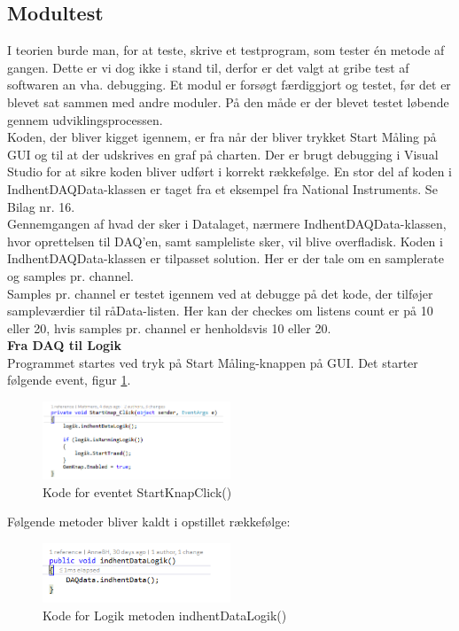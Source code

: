 \subsection{Modultest}
I teorien burde man, for at teste, skrive et testprogram, som tester én metode af gangen. Dette er vi dog ikke i stand til, derfor er det valgt at gribe test af softwaren an vha. debugging. Et modul er forsøgt færdiggjort og testet, før det er blevet sat sammen med andre moduler. På den måde er der blevet testet løbende gennem udviklingsprocessen. \\ \newline
Koden, der bliver kigget igennem, er fra når der bliver trykket Start Måling på GUI og til at der udskrives en graf på charten. Der er brugt debugging i Visual Studio for at sikre koden bliver udført i korrekt rækkefølge. En stor del af koden i IndhentDAQData-klassen er taget fra et eksempel fra National Instruments. Se Bilag nr. 16. \\
Gennemgangen af hvad der sker i Datalaget, nærmere IndhentDAQData-klassen, hvor oprettelsen til DAQ’en, samt sampleliste sker, vil blive overfladisk. Koden i IndhentDAQData-klassen er tilpasset solution. Her er der tale om en samplerate og samples pr. channel. \\
Samples pr. channel er testet igennem ved at debugge på det kode, der tilføjer sampleværdier til råData-listen. Her kan der checkes om listens count er på 10 eller 20, hvis samples pr. channel er henholdsvis 10 eller 20.\\
\newpage
\textbf{Fra DAQ til Logik}\\
Programmet startes ved tryk på Start Måling-knappen på GUI. Det starter følgende event, figur \ref{fig:StartKnapClick}.
\begin{figure}[H]
	\centering
	\includegraphics[width=0.5\textwidth]{FigurerProgram/StartKnap}
	\caption{Kode for eventet StartKnapClick()}
	\label{fig:StartKnapClick}
\end{figure}
Følgende metoder bliver kaldt i opstillet rækkefølge:

\begin{figure}[H]
	\centering
	\includegraphics[width=0.5\textwidth]{FigurerProgram/IndhentDataLogik}
	\caption{Kode for Logik metoden indhentDataLogik()}
	\label{fig:IndhentDAQData_logik}
\end{figure}

